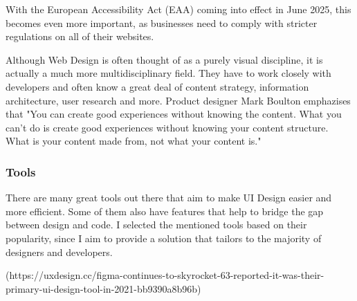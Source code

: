With the European Accessibility Act (EAA) coming into effect in June 2025, this becomes even more
important, as businesses need to comply with stricter regulations on all of their websites.

Although Web Design is often thought of as a purely visual discipline, it is actually a much more
multidisciplinary field. They have to work closely with developers and often know a great deal of
content strategy, information architecture, user research and more. Product designer Mark Boulton
emphazises that "You can create good experiences without knowing the content. What you can’t do is
create good experiences without knowing your content structure. What is your content made from, not
what your content is."  



\subsubsection{Tools}
There are many great tools out there that aim to make UI Design easier and more efficient. Some of
them also have features that help to bridge the gap between design and code. I selected the
mentioned tools based on their popularity, since I aim to provide a solution that tailors to the
majority of designers and developers.

(https://uxdesign.cc/figma-continues-to-skyrocket-63-reported-it-was-their-primary-ui-design-tool-in-2021-bb9390a8b96b)

